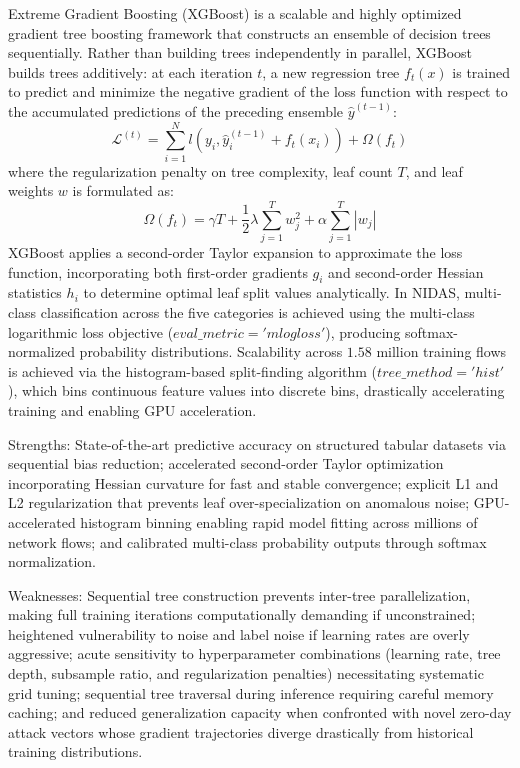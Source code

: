 \documentclass[12pt,a4paper]{report}
\begin{document}
Extreme Gradient Boosting (XGBoost) is a scalable and highly optimized gradient tree boosting framework that constructs an ensemble of decision trees sequentially. Rather than building trees independently in parallel, XGBoost builds trees additively: at each iteration $t$, a new regression tree $f_t(x)$ is trained to predict and minimize the negative gradient of the loss function with respect to the accumulated predictions of the preceding ensemble $\hat{y}^{(t-1)}$:
\begin{equation}
\mathcal{L}^{(t)} = \sum_{i=1}^{N} l\left(y_i, \hat{y}_i^{(t-1)} + f_t(x_i)\right) + \Omega(f_t)
\end{equation}
where the regularization penalty on tree complexity, leaf count $T$, and leaf weights $w$ is formulated as:
\begin{equation}
\Omega(f_t) = \gamma T + \frac{1}{2} \lambda \sum_{j=1}^{T} w_j^2 + \alpha \sum_{j=1}^{T} |w_j|
\end{equation}
XGBoost applies a second-order Taylor expansion to approximate the loss function, incorporating both first-order gradients $g_i$ and second-order Hessian statistics $h_i$ to determine optimal leaf split values analytically. In NIDAS, multi-class classification across the five categories is achieved using the multi-class logarithmic loss objective ($eval\_metric='mlogloss'$), producing softmax-normalized probability distributions. Scalability across $1.58$ million training flows is achieved via the histogram-based split-finding algorithm ($tree\_method='hist'$), which bins continuous feature values into discrete bins, drastically accelerating training and enabling GPU acceleration.

Strengths: State-of-the-art predictive accuracy on structured tabular datasets via sequential bias reduction; accelerated second-order Taylor optimization incorporating Hessian curvature for fast and stable convergence; explicit L1 and L2 regularization that prevents leaf over-specialization on anomalous noise; GPU-accelerated histogram binning enabling rapid model fitting across millions of network flows; and calibrated multi-class probability outputs through softmax normalization.

Weaknesses: Sequential tree construction prevents inter-tree parallelization, making full training iterations computationally demanding if unconstrained; heightened vulnerability to noise and label noise if learning rates are overly aggressive; acute sensitivity to hyperparameter combinations (learning rate, tree depth, subsample ratio, and regularization penalties) necessitating systematic grid tuning; sequential tree traversal during inference requiring careful memory caching; and reduced generalization capacity when confronted with novel zero-day attack vectors whose gradient trajectories diverge drastically from historical training distributions.
\end{document}
